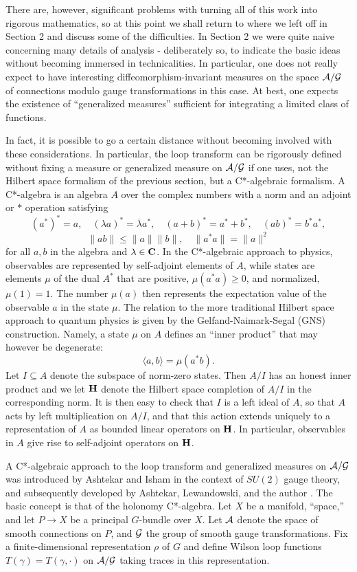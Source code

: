 \documentclass[12pt]{article}
\newcommand{\A}{{\cal A}}
\newcommand{\G}{{\cal G}}
\renewcommand{\H}{{\bf H}}
\newcommand{\C}{{\bf C}}
\begin{document}
There are, however, significant problems with turning all of this work into
rigorous mathematics, so at this point we shall return to where we left off
in Section 2 and discuss some of the difficulties. In Section 2 we were
quite naive concerning many details of analysis - deliberately so, to
indicate the basic ideas without becoming immersed in technicalities.   In
particular, one does not really expect to have interesting
diffeomorphism-invariant measures on the space $\A/\G$ of connections
modulo gauge transformations in this case.  At best, one expects the
existence of  ``generalized measures'' sufficient for integrating a limited
class of functions.

In fact, it is possible to go a certain distance without becoming involved
with these considerations.   In particular,
the loop transform can be rigorously defined without fixing a
measure or generalized measure on $\A/\G$ if one uses, not the Hilbert
space formalism of the previous section, but a C*-algebraic formalism.  A
C*-algebra is an algebra $A$ over the complex numbers with a norm and an
adjoint or $\ast$ operation satisfying
\[    (a^\ast)^\ast = a,\quad
(\lambda a)^\ast = \overline \lambda a^\ast, \quad (a + b)^\ast = a^\ast +
b^\ast, \quad (ab)^\ast = b^\ast a^\ast ,\]
\[    \|ab\| \le \|a\| \|b\| , \quad \|a^\ast a\| = \|a\|^2 \]
for all $a,b$ in the algebra and $\lambda
\in \C$.  In the C*-algebraic approach to physics, observables are
represented by self-adjoint elements of $A$, while states are elements
$\mu$ of the dual $A^\ast$ that are positive, $\mu(a^\ast a) \ge 0$,
and normalized, $\mu(1) = 1$.   The number $\mu(a)$ then
represents the expectation value of the observable $a$ in the state $\mu$.
The relation to the more traditional Hilbert space approach to quantum
physics is given by the Gelfand-Naimark-Segal (GNS) construction.  Namely,
a state $\mu$ on $A$ defines an ``inner product'' that may however be
degenerate:
\[             \langle a,b \rangle = \mu(a^\ast b)  .\]
Let $I \subseteq A$ denote the subspace of norm-zero states. Then $A/I$
has an honest inner product and we let $\H$ denote the Hilbert space
completion of $A/I$ in the corresponding norm.  It is then easy to check
that $I$ is a left ideal of $A$, so that $A$ acts by left multiplication on
$A/I$, and that this action extends uniquely to a representation of $A$ as
bounded linear operators on $\H$.  In particular, observables in $A$ give
rise to self-adjoint operators on $\H$.

A C*-algebraic approach to the loop transform and generalized measures on
$\A/\G$ was introduced by Ashtekar and Isham \cite{AI} in the context of
$SU(2)$ gauge theory, and subsequently developed by Ashtekar, Lewandowski,
and the author \cite{AL,Baez}.  The basic concept is that of the holonomy
C*-algebra. Let $X$ be a manifold, ``space,'' and let $P \to X$ be a
principal $G$-bundle over $X$.  Let $\A$ denote the space of smooth
connections on $P$, and $\G$ the group of smooth gauge transformations.
Fix a finite-dimensional representation $\rho$ of $G$ and define Wilson
loop functions $T(\gamma) = T(\gamma,\cdot)$ on $\A/\G$ taking traces in
this representation.
\end{document}
